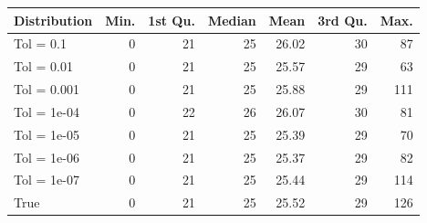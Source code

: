 \begin{figure} 
\begin{tabular}{lrrrrrr}
 Distribution & Min. & 1st Qu. & Median & Mean & 3rd Qu. & Max. \\ 
  \hline
\hline
Tol =  0.1 & 0 & 21 & 25 & 26.02 & 30 & 87 \\ 
  Tol =  0.01 & 0 & 21 & 25 & 25.57 & 29 & 63 \\ 
  Tol =  0.001 & 0 & 21 & 25 & 25.88 & 29 & 111 \\ 
  Tol =  1e-04 & 0 & 22 & 26 & 26.07 & 30 & 81 \\ 
  Tol =  1e-05 & 0 & 21 & 25 & 25.39 & 29 & 70 \\ 
  Tol =  1e-06 & 0 & 21 & 25 & 25.37 & 29 & 82 \\ 
  Tol =  1e-07 & 0 & 21 & 25 & 25.44 & 29 & 114 \\ 
  True & 0 & 21 & 25 & 25.52 & 29 & 126 \\ 
  \end{tabular}
\label{tab:SummaryTable}
\end{figure} 
